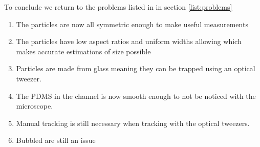 To conclude we return to the problems listed in in section \ref{list:problems} 

\begin{enumerate} \label{list:solutions}
	\item The particles are now all symmetric enough to make useful measurements
	\item The particles have low aspect ratios and uniform widths allowing which makes accurate estimations of size possible
	\item Particles are made from glass meaning they can be trapped using an optical tweezer.
	\item The PDMS in the channel is now smooth enough to not be noticed with the microscope.
	\item Manual tracking is still necessary when tracking with the optical tweezers.
	\item Bubbled are still an issue
\end{enumerate}
